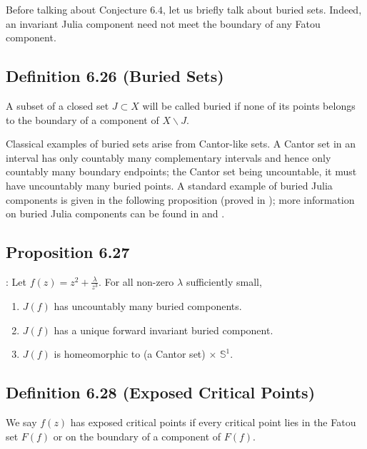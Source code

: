 \documentclass[11pt,a4paper]{article}
\begin{document}

   Before talking about Conjecture $6.4$, let us briefly talk about buried sets. Indeed, an invariant Julia component need not meet the boundary of any Fatou component.

   \subsection*{Definition 6.26 (Buried Sets)} A subset of a closed set $J \subset X$ will be called buried if none of its points belongs to the boundary of a component of $X\backslash J$.


   Classical examples of buried sets arise from Cantor-like sets. A Cantor set in an interval has only countably many complementary intervals and hence only countably many boundary endpoints; the Cantor set being uncountable, it must have uncountably many buried points. A standard example of buried Julia components is given in the following proposition (proved in \cite{mcmullen1988automorphisms}); more information on buried Julia components can be found in \cite{godillon2015family} and \cite{wang2022buried}.

   \subsection*{Proposition 6.27}: Let $f(z) = z^2 + \frac{\lambda}{z^3}$. For all non-zero $\lambda$ sufficiently small,
   \begin{enumerate}
       \item $J(f)$ has uncountably many buried components.
       \item $J(f)$ has a unique forward invariant buried component.
       \item $J(f)$ is homeomorphic to (a Cantor set) $\times$ $\mathbb{S}^1$.
   \end{enumerate}


   \subsection*{Definition 6.28 (Exposed Critical Points)} We say $f(z)$ has exposed critical points if every critical point lies in the Fatou set $F(f)$ or on the boundary of a component of $F(f)$.
\end{document}
